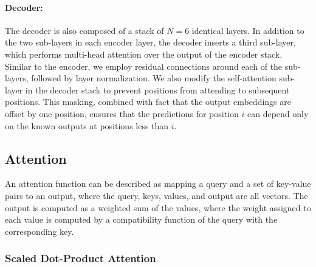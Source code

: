 \paragraph{Decoder:}The decoder is also composed of a stack of $N=6$ identical layers.  In addition to the two sub-layers in each encoder layer, the decoder inserts a third sub-layer, which performs multi-head attention over the output of the encoder stack.  Similar to the encoder, we employ residual connections around each of the sub-layers, followed by layer normalization.  We also modify the self-attention sub-layer in the decoder stack to prevent positions from attending to subsequent positions.  This masking, combined with fact that the output embeddings are offset by one position, ensures that the predictions for position $i$ can depend only on the known outputs at positions less than $i$.


\subsection{Attention} \label{sec:attention}
An attention function can be described as mapping a query and a set of key-value pairs to an output, where the query, keys, values, and output are all vectors.  The output is computed as a weighted sum of the values, where the weight assigned to each value is computed by a compatibility function of the query with the corresponding key.

\subsubsection{Scaled Dot-Product Attention} \label{sec:scaled-dot-prod}


